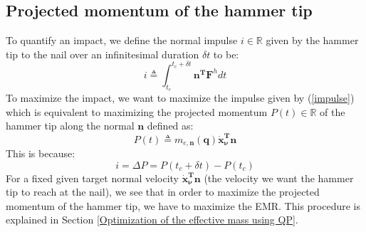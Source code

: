 \documentclass[conference]{IEEEtran}
\begin{document}
\subsection{Projected momentum of the hammer tip}
\noindent
To quantify an impact, we define the normal impulse $i \in \mathbb{R}$ given by the hammer tip to the nail over an infinitesimal duration $\delta t$ to be: 
\begin{equation}
    i \triangleq \int_{t_c}^{t_c + \delta t} 
    \mathbf{n^T} \mathbf{F}^hdt
\label{impulse}
\end{equation}
To maximize the impact, we want to maximize the impulse given by (\ref{impulse}) which is equivalent to maximizing the projected momentum $P(t) \in \mathbb{R}$ of the hammer tip along the normal $\mathbf{n}$ \cite{SinglePointParticle} defined as:
\begin{equation}
    P(t) \triangleq m_{e,\mathbf{n}}(\mathbf{q})  \mathbf{\dot x_{\nu}^T} \mathbf{n} 
\label{Momentum end effector}
\end{equation}
This is because: 
\begin{equation}
    i = \Delta P = P(t_c + \delta t) - P(t_c)
\end{equation}
For a fixed given target normal velocity $\mathbf{\dot x_\nu^T n}$ (the velocity we want the hammer tip to reach at the nail), we see that in order to maximize the projected momentum of the hammer tip, we have to maximize the EMR. This procedure is explained in Section \ref{Optimization of the effective mass using QP}.
\end{document}
